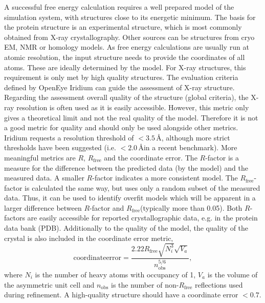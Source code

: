 \documentclass[9pt,bestpractices]{livecoms}
\begin{document}
A successful free energy calculation requires a well prepared model of the simulation system, with structures close to its energetic minimum. 
%
The basis for the protein structure is an experimental structure, which is most commonly obtained from X-ray crystallography.
Other sources can be structures from cryo EM, NMR or homology models.
As free energy calculations are usually run at atomic resolution, the input structure needs to provide the coordinates of all atoms. These are ideally determined by the model.
%
For X-ray structures, this requirement is only met by high quality structures.
The evaluation criteria defined by OpenEye Iridium\cite{warrenEssentialConsiderationsUsing2012} can guide the assessment of X-ray structure. 
%
Regarding the assessment overall quality of the structure (global criteria), the X-ray resolution is often used as it is easily accessible.
%
However, this metric only gives a theoretical limit and not the real quality of the model. Therefore it is not a good metric for quality and should only be used alongside other metrics. Iridium requests a resolution threshold of $< 3.5\,$\AA,\cite{warrenEssentialConsiderationsUsing2012} although more strict thresholds have been suggested (i.e. $<2.0\,$\AA  in a recent benchmark\cite{schindlerLargeScaleAssessmentBinding2020}).
%
More meaningful metrics are $R$, $R_{\mathrm{free}}$ and the coordinate error. 
%
The $R$-factor is a measure for the difference between the predicted data (by the model) and the measured data. A smaller $R$-factor indicates a more consistent model. 
%
The $R_{\mathrm{free}}$-factor is calculated the same way, but uses only a random subset of the measured data. Thus, it can be used to identify overfit models which will be apparent in a larger difference between $R$-factor and $R_{\mathrm{free}}$(typically more than 0.05).
Both $R$-factors are easily accessible for reported crystallographic data, e.g. in the protein data bank (PDB).\cite{bermanProteinDataBank2000} 
%
Additionally to the quality of the model, the quality of the crystal is also included in the coordinate error metric,
%
\begin{equation}
    \mathrm{coordinate error} = \frac{2.22 R_{\mathrm{free}}\sqrt{N_i^3}\sqrt{V_a}} {n_{\mathrm{obs}}^{5/6}},
    \label{eq:coordinate_error}
\end{equation}
%
where $N_i$ is the number of heavy atoms with occupancy of 1, $V_a$ is the volume of the asymmetric unit cell and $n_{\mathrm{obs}}$ is the number of non-$R_{\mathrm{free}}$ reflections used during refinement. A high-quality structure should have a coordinate error $<0.7$.
\end{document}
